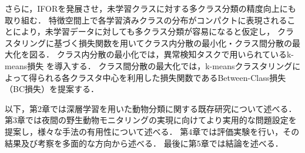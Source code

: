さらに，IFORを発展させ，未学習クラスに対する多クラス分類の精度向上にも取り組む．
特徴空間上で各学習済みクラスの分布がコンパクトに表現されることにより，未学習データに対しても多クラス分類が容易になると仮定し，
クラスタリングに基づく損失関数を用いてクラス内分散の最小化・クラス間分散の最大化を図る．
クラス内分散の最小化では，異常検知タスクで用いられているk-means損失 \cite{k-means} を導入する．
クラス間分散の最大化では，k-meansクラスタリングによって得られる各クラスタ中心を利用した損失関数であるBetween-Class損失（BC損失）を提案する．

以下，第2章では深層学習を用いた動物分類に関する既存研究について述べる．
第3章では夜間の野生動物モニタリングの実現に向けてより実用的な問題設定を提案し，様々な手法の有用性について述べる．
第4章では評価実験を行い，その結果及び考察を多面的な方向から述べる．
最後に第5章では結論を述べる．